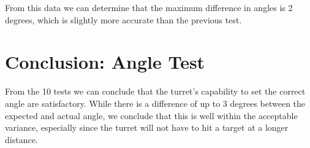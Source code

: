 
From this data we can determine that the maximum difference in angles is 2
degrees, which is slightly more accurate than the previous test.

\section{Conclusion: Angle Test}
From the 10 tests we can conclude that the turret's capability to set the
correct angle are satisfactory. While there is a difference of up to 3 degrees
between the expected and actual angle, we conclude that this is well within the
acceptable variance, especially since the turret will not have to hit a target
at a longer distance.
